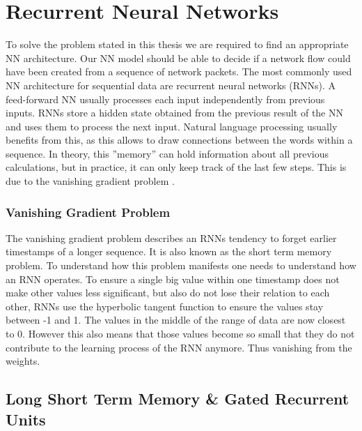 \documentclass[
	ngerman,
	ruledheaders=section,%
	class=report,%
	thesis={type=bachelor},%
	accentcolor=9c,%
	custommargins=true,%
	marginpar=false,%
	parskip=half-,%
	fontsize=11pt,%
]{tudapub}
\begin{document}
\section{Recurrent Neural Networks}
\label{sec:RNN}

To solve the problem stated in this thesis we are required to find an appropriate NN architecture.
Our NN model should be able to decide if a network flow could have been created from a sequence of network packets.
The most commonly used NN architecture for sequential data are recurrent neural networks (RNNs).
A feed-forward NN usually processes each input independently from previous inputs.
RNNs store a hidden state obtained from the previous result of the NN and uses them to process the next input.
Natural language processing usually benefits from this, as this allows to draw connections between the words within a sequence.
In theory, this ''memory'' can hold information about all previous calculations,
but in practice, it can only keep track of the last few steps.
This is due to the vanishing gradient problem \cite{hochreiterLongShortTermMemory1997}.

\subsubsection{Vanishing Gradient Problem}
\label{sec:vanishing}

The vanishing gradient problem describes an RNNs tendency to forget earlier timestamps of a longer sequence.
It is also known as the short term memory problem.
To understand how this problem manifests one needs to understand how an RNN operates.
To ensure a single big value within one timestamp does not make other values less significant, but also do not lose their relation to each other, RNNs use the hyperbolic tangent function to ensure the values stay between -1 and 1.
The values in the middle of the range of data are now closest to 0.
However this also means that those values become so small that they do not contribute to the learning process of the RNN anymore.
Thus vanishing from the weights.

\subsection{Long Short Term Memory \& Gated Recurrent Units}
\label{sec:LSTMandGRU}
\end{document}
